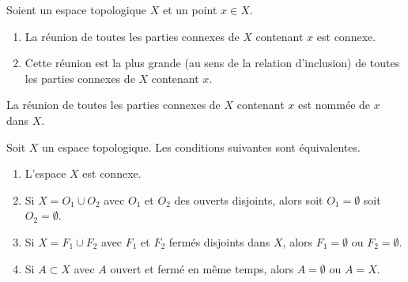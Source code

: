 \begin{propositionDef}        \label{DEFooFHXNooJGUPPn}
	Soient un espace topologique \( X\) et un point \( x\in X\).
	\begin{enumerate}
		\item		\label{ITEMooBZAQooNwuzaS}
		      La réunion de toutes les parties connexes de \( X\) contenant \( x\) est connexe.
		\item
		      Cette réunion est la plus grande (au sens de la relation d'inclusion) de toutes les parties connexes de \( X\) contenant \( x\).
	\end{enumerate}
	La réunion de toutes les parties connexes de \( X\) contenant \( x\) est nommée  de \( x\) dans \( X\).
\end{propositionDef}

\begin{proposition} \label{PropHSjJcIr}
	Soit \( X\) un espace topologique. Les conditions suivantes sont équivalentes.
	\begin{enumerate}
		\item       \label{ITEMooXHIKooGqrgTs}
		      L'espace \( X\) est connexe.
		\item       \label{ITEMooRTNPooADKVnw}
		      Si \( X=O_1\cup O_2\) avec \( O_1\) et \( O_2\) des ouverts disjoints, alors soit \( O_1=\emptyset\) soit \( O_2=\emptyset\).
		\item       \label{ITEMooOEZYooFBNaOZ}
		      Si \( X=F_1\cup F_2\) avec \( F_1\) et \( F_2\) fermés disjoints dans \( X\), alors \( F_1=\emptyset\) ou \( F_2=\emptyset\).
		\item       \label{ITEMooNIPZooIDPmEf}
		      Si \( A\subset X\) avec \( A\) ouvert et fermé en même temps, alors \( A=\emptyset\) ou \( A=X\).
	\end{enumerate}
\end{proposition}

